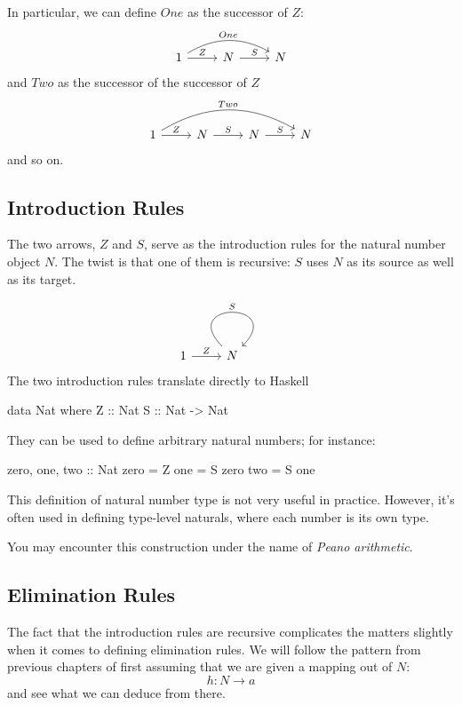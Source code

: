 \documentclass[DaoFP]{subfiles}
\begin{document}
In particular, we can define $One$ as the successor of $Z$:
\[
 \begin{tikzcd}
 1
 \arrow[rr, bend left, "One"]
 \arrow[r, "Z"]
 &N
  \arrow[r, "S"]
&N
  \end{tikzcd}
\]
and $Two$ as the successor of the successor of $Z$
\[
 \begin{tikzcd}
 1
 \arrow[rrr, bend left, "Two"]
 \arrow[r, "Z"]
 &N
  \arrow[r, "S"]
&N
  \arrow[r, "S"]
 &N
 \end{tikzcd}
\]
and so on.

\subsection{Introduction Rules}

The two arrows, $Z$ and $S$, serve as the introduction rules for the natural number object $N$. The twist is that one of them is recursive: $S$ uses $N$ as its source as well as its target.

\[
 \begin{tikzcd}
 1
 \arrow[r, "Z"]
 &N
 \arrow[out=135, in=45, loop, "S"]
 \end{tikzcd}
\]
The two introduction rules translate directly to Haskell


\begin{haskell}
data Nat where
  Z :: Nat
  S :: Nat -> Nat
\end{haskell}
They can be used to define arbitrary natural numbers; for instance:

\begin{haskell}
zero, one, two :: Nat
zero = Z
one  = S zero
two  = S one
\end{haskell}

This definition of natural number type is not very useful in practice. However, it's often used in defining type-level naturals, where each number is its own type. 

You may encounter this construction under the name of \emph{Peano arithmetic}.

\subsection{Elimination Rules}

The fact that the introduction rules are recursive complicates the matters slightly when it comes to defining elimination rules. We will follow the pattern from previous chapters of first assuming that we are given a mapping out of $N$:
\[ h \colon N \to a \]
and see what we can deduce from there. 
\end{document}

